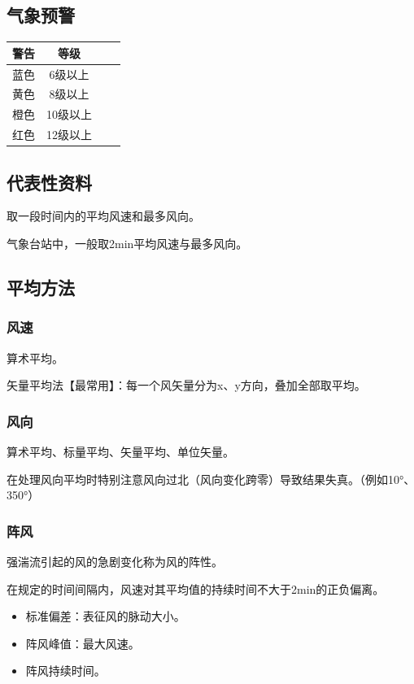 \documentclass[UTF8,11pt]{ctexbook}
\begin{document}
\subsection{气象预警}
\begin{table}[htbp]
    \centering
    \begin{tabular}{cccc}
        \toprule
        警告 & 等级\\
        \midrule
        蓝色 & 6级以上\\
        黄色 & 8级以上\\
        橙色 & 10级以上\\
        红色 & 12级以上\\
        \bottomrule
    \end{tabular}
\end{table}

\subsection{代表性资料}

取一段时间内的平均风速和最多风向。

气象台站中，一般取2min平均风速与最多风向。

\subsection{平均方法}

\subsubsection{风速}

算术平均。

矢量平均法【最常用】：每一个风矢量分为x、y方向，叠加全部取平均。

\subsubsection{风向}

算术平均、标量平均、矢量平均、单位矢量。

在处理风向平均时特别注意风向过北（风向变化跨零）导致结果失真。（例如10°、350°）

\subsubsection{阵风}

强湍流引起的风的急剧变化称为风的阵性。

在规定的时间间隔内，风速对其平均值的持续时间不大于2min的正负偏离。
\begin{itemize}
    \item 标准偏差：表征风的脉动大小。
    \item 阵风峰值：最大风速。
    \item 阵风持续时间。
\end{itemize}
\end{document}
